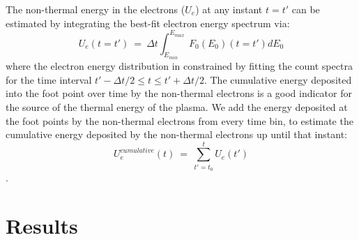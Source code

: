 \begin{table}
    \centering
    \caption{Fitted temperature of the hotter component of the thermal plasma during various stages of the flare.}
    \label{tab:tab1}
\end{table}

The non-thermal energy in the electrons ($U_{e}$) at any instant $t=t'$ can be estimated by integrating the best-fit electron energy spectrum via: $$U_{e}(t=t')~=~\Delta t\int_{E_{min}}^{E_{max}}~F_{0}(E_{0})(t=t')dE_{0}$$ where the electron energy distribution in constrained by fitting the count spectra for the time interval $t'-\Delta t/2 \le t \le t'+\Delta t/2$. The cumulative energy deposited into the foot point over time by the non-thermal electrons is a good indicator for the source of the thermal energy of the plasma. We add the energy deposited at the foot points by the non-thermal electrons from every time bin, to estimate the cumulative energy deposited by the non-thermal electrons up until that instant: $$U^{cumulative}_{e}(t)~=~\sum_{t'=t_{0}}^{t}U_{e}(t')$$.

\section{Results}\label{res}

